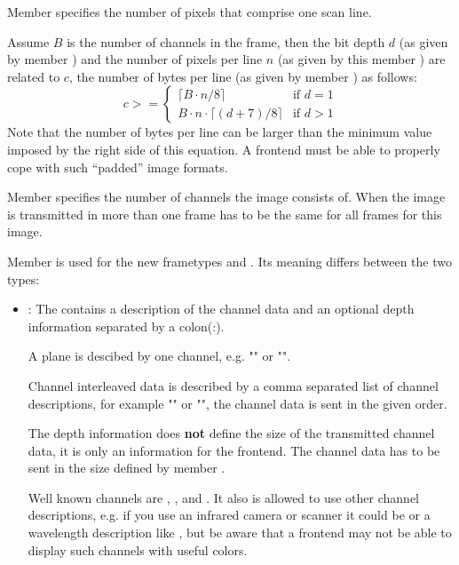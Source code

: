 \documentclass[11pt,DVIps]{report}
\begin{document}
\begin{changebar}
Member  specifies the number of pixels that
comprise one scan line.

Assume $B$ is the number of channels in the frame, then the bit depth
$d$ (as given by member ) and the number of pixels per
line $n$ (as given by this member ) are
related to $c$, the number of bytes per line (as given by member
) as follows:
\[
  c >= \left\{
  \begin{array}{ll}
    \lceil B\cdot n / 8\rceil & \mbox{if $d=1$}\\
    B\cdot n \cdot \lceil (d + 7)/8 \rceil & \mbox{if $d>1$}
  \end{array}
  \right.
\]
Note that the number of bytes per line can be larger than the minimum
value imposed by the right side of this equation.  A frontend must be
able to properly cope with such ``padded'' image formats.

Member  specifies the number of channels the
image consists of. When the image is transmitted in more than one frame
 has to be the same for all frames for this image.

Member  is used for the new frametypes 
 and . Its meaning differs 
between the two types: 

\begin{itemize}
\item
{}: 
The  contains a description of the channel data and
an optional depth information separated by a colon(:).

A plane is descibed by one channel, e.g. "" or "".

Channel interleaved data is described by a comma separated list of channel descriptions,
for example "" or "",
the channel data is sent in the given order.

The depth information does {\bf not} define the size of the transmitted
channel data, it is only an information for the frontend. The channel data has
to be sent in the size defined by member .

Well known channels are , ,  and .
It also is allowed to use other channel descriptions, e.g. if you
use an infrared camera or scanner it could be  or
a wavelength description like , but be aware that a
frontend may not be able to display such channels with useful colors.


\end{itemize}
\end{changebar}
\end{document}

